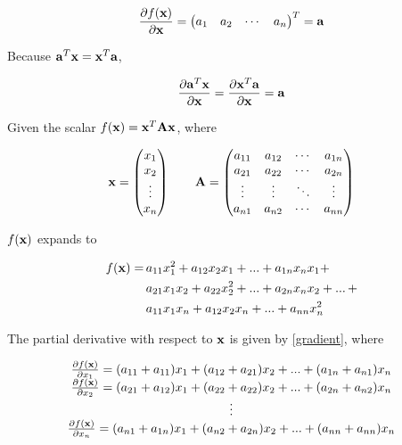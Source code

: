 \documentclass{article}
\newcommand{\vect}[1]{\textbf{\textrm{#1}}}
\newcommand{\pd}[2]{\frac{\partial {#1}}{\partial {#2}}}
\begin{document}
\begin{equation*}
	\pd{f(\vect{x})}{\vect{x}} = 
	\begin{pmatrix}
		a_1 & a_2 & \cdots & a_n
	\end{pmatrix}^{T} 
	= \vect{a}
\end{equation*}

Because $\vect{a}^{T}\vect{x} = \vect{x}^{T}\vect{a}$,

\begin{equation} \label{scalargradvv}
	\pd{\vect{a}^{T}\vect{x}}{\vect{x}} = \pd{\vect{x}^{T}\vect{a}}{\vect{x}} = \vect{a} \\[2em]
\end{equation} 

Given the scalar $f(\vect{x}) = \vect{x}^{T}\vect{A}\vect{x}$, where

\begin{equation*}
	\vect{x}= 
	\begin{pmatrix}
		x_1 \\ 
		x_2 \\ 
		\vdots \\ 
		x_n
	\end{pmatrix}
	\qquad \vect{A} = 
	\begin{pmatrix}
		a_{11} & a_{12} & \cdots & a_{1n} \\
		a_{21} & a_{22} & \cdots & a_{2n} \\
		\vdots & \vdots & \ddots & \vdots \\
		a_{n1} & a_{n2} & \cdots & a_{nn}
	\end{pmatrix}
\end{equation*}

$f(\vect{x})$ expands to

\begin{align*}
	f(\vect{x}) = \, & a_{11}x_1^2 + a_{12}x_2x_1 + ... + a_{1n}x_nx_1 + \\
				  & a_{21}x_1x_2 + a_{22}x_2^2 + ... + a_{2n}x_nx_2 + ... \, + \\
				  & a_{11}x_1x_n + a_{12}x_2x_n + ... + a_{nn}x_n^2
\end{align*}

The partial derivative with respect to $\vect{x}$ is given by \eqref{gradient}, where

\begin{equation*}
	\begin{matrix}
		\pd{f(\vect{x})}{x_1} = (a_{11} + a_{11})x_1 + (a_{12} + a_{21})x_2 + ... + 
							   	(a_{1n} + a_{n1})x_n \\
		\pd{f(\vect{x})}{x_2} = (a_{21} + a_{12})x_1 + (a_{22} + a_{22})x_2 + ... + 
							   	(a_{2n} + a_{n2})x_n \\
		\vdots \\
		\pd{f(\vect{x})}{x_n} = (a_{n1} + a_{1n})x_1 + (a_{n2} + a_{2n})x_2 + ... + 
							   	(a_{nn} + a_{nn})x_n 
	\end{matrix}
\end{equation*}
\end{document}

